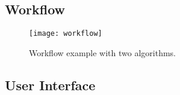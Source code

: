 \subsection{Workflow}

\begin{figure}[h]
  \centering
      \texttt{[image: workflow]}
  \caption{Workflow example with two algorithms.}
  \label{fig:Workflow}
\end{figure}

\subsection{User Interface}
